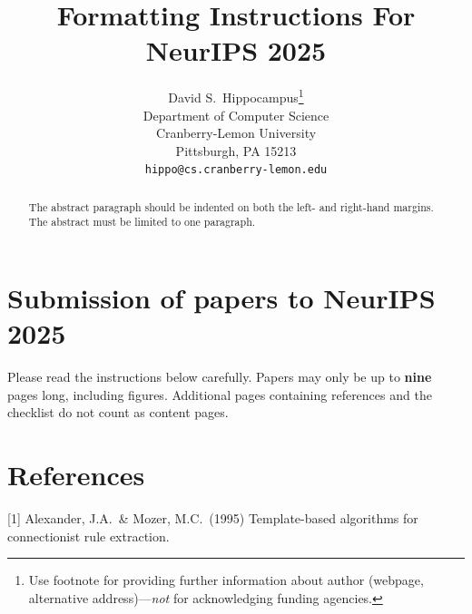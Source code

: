 \documentclass{article}
\title{Formatting Instructions For NeurIPS 2025}
\author{%
  David S.~Hippocampus\thanks{Use footnote for providing further information
    about author (webpage, alternative address)---\emph{not} for acknowledging
    funding agencies.} \\
  Department of Computer Science\\
  Cranberry-Lemon University\\
  Pittsburgh, PA 15213 \\
  \texttt{hippo@cs.cranberry-lemon.edu} \\
}
\begin{document}
\maketitle

\begin{abstract}
  The abstract paragraph should be indented on both the left- and right-hand
  margins. The abstract must be limited to one paragraph.
\end{abstract}

\section{Submission of papers to NeurIPS 2025}

Please read the instructions below carefully. Papers may only be up to
{\bf nine} pages long, including figures. Additional pages containing
references and the checklist do not count as content pages.

\section*{References}

{\small [1] Alexander, J.A.\ \& Mozer, M.C.\ (1995) Template-based algorithms
for connectionist rule extraction.}
\end{document}
